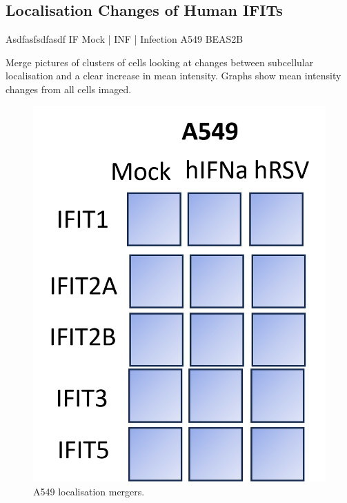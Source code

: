 \subsection{Localisation Changes of Human IFITs} \label{Localisation Changes of Human IFITs}
Asdfasfsdfasdf \newline
IF Mock | INF | Infection \newline
A549 BEAS2B

Merge pictures of clusters of cells looking at changes between subcellular localisation and a clear increase in mean intensity. Graphs show mean intensity changes from all cells imaged.

\begin{figure}
    \centering
    \includegraphics[width=1\linewidth]{06. Chapter 1/Figs/02. Localisation/01. a549 merges.png}
    \caption[A549 localisation mergers.]{A549 localisation mergers.}
    \label{A549 localisation mergers.}
\end{figure}


